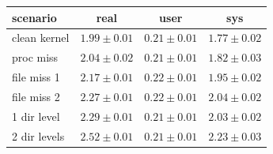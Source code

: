\begin{table}
\small
\centering
\begin{tabular}{ | l || c | c | c | }
\hline
scenario & real & user & sys \\
\hline \hline
clean kernel & \begin{math} 1.99\pm0.01 \end{math} & \begin{math} 0.21\pm0.01 \end{math} & \begin{math} 1.77\pm0.02 \end{math} \\
proc miss & \begin{math} 2.04\pm0.02 \end{math} & \begin{math} 0.21\pm0.01 \end{math} & \begin{math} 1.82\pm0.03 \end{math} \\
file miss 1 & \begin{math} 2.17\pm0.01 \end{math} & \begin{math} 0.22\pm0.01 \end{math} & \begin{math} 1.95\pm0.02 \end{math} \\
file miss 2 & \begin{math} 2.27\pm0.01 \end{math} & \begin{math} 0.22\pm0.01 \end{math} & \begin{math} 2.04\pm0.02 \end{math} \\
1 dir level & \begin{math} 2.29\pm0.01 \end{math} & \begin{math} 0.21\pm0.01 \end{math} & \begin{math} 2.03\pm0.02 \end{math} \\
2 dir levels & \begin{math} 2.52\pm0.01 \end{math} & \begin{math} 0.21\pm0.01 \end{math} & \begin{math} 2.23\pm0.03 \end{math} \\

\end{tabular}
\end{table}
